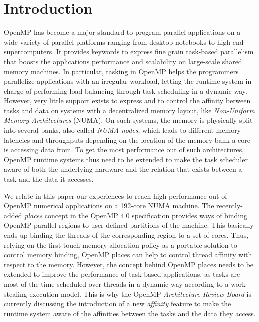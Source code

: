 \documentclass{Styles/llncs}
\begin{document}
\section{Introduction}

OpenMP has become a major standard to program parallel applications on a wide variety of parallel platforms ranging from desktop notebooks to high-end supercomputers. It provides keywords to express fine grain task-based parallelism that boosts the applications performance and scalability on large-scale shared memory machines. In particular, tasking in OpenMP helps the programmers parallelize applications with an irregular workload, letting the runtime system in charge of performing load balancing through task scheduling in a dynamic way. However, very little support exists to express and to control the affinity between tasks and data on systems with a decentralized memory layout, like \emph{Non-Uniform Memory Architectures} (NUMA). On such systems, the memory is physically split into several banks, also called \emph{NUMA nodes}, which leads to different memory latencies and throughputs depending on the location of the memory bank a core is accessing data from. To get the most performance out of such architectures, OpenMP runtime systems thus need to be extended to make the task scheduler aware of both the underlying hardware and the relation that exists between a task and the data it accesses.

 We relate in this paper our experiences to reach high performance out of OpenMP numerical applications on a 192-core NUMA machine. The recently-added \emph{places} concept in the OpenMP 4.0 specification provides ways of binding OpenMP parallel regions to user-defined partitions of the machine. This basically ends up binding the threads of the corresponding region to a set of cores. Thus, relying on the first-touch memory allocation policy as a portable solution to control memory binding, OpenMP places can help to control thread affinity with respect to the memory.
However, the concept behind OpenMP places needs to be extended to improve the performance of task-based applications, as tasks are most of the time scheduled over threads in a dynamic way according to a work-stealing execution model.  This is why the OpenMP \emph{Architecture Review Board} is currently discussing the introduction of a new \textit{affinity} feature to make the runtime system aware of the affinities between the tasks and the data they access.
\end{document}
